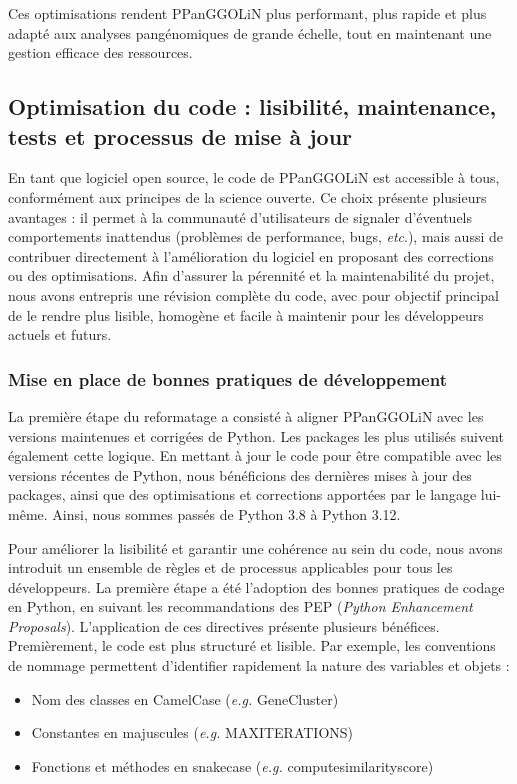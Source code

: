 Ces optimisations rendent PPanGGOLiN plus performant, plus rapide et plus adapté aux analyses pangénomiques de grande échelle, tout en maintenant une gestion efficace des ressources.

\subsection{Optimisation du code : lisibilité, maintenance, tests et processus de mise à jour}

En tant que logiciel open source, le code de PPanGGOLiN est accessible à tous, conformément aux principes de la science ouverte. Ce choix présente plusieurs avantages : il permet à la communauté d’utilisateurs de signaler d’éventuels comportements inattendus (problèmes de performance, bugs, \textit{etc}.), mais aussi de contribuer directement à l’amélioration du logiciel en proposant des corrections ou des optimisations.
Afin d’assurer la pérennité et la maintenabilité du projet, nous avons entrepris une révision complète du code, avec pour objectif principal de le rendre plus lisible, homogène et facile à maintenir pour les développeurs actuels et futurs.

\subsubsection{Mise en place de bonnes pratiques de développement}

La première étape du reformatage a consisté à aligner PPanGGOLiN avec les versions maintenues et corrigées de Python. Les packages les plus utilisés suivent également cette logique. En mettant à jour le code pour être compatible avec les versions récentes de Python, nous bénéficions des dernières mises à jour des packages, ainsi que des optimisations et corrections apportées par le langage lui-même. Ainsi, nous sommes passés de Python 3.8 à Python 3.12.

Pour améliorer la lisibilité et garantir une cohérence au sein du code, nous avons introduit un ensemble de règles et de processus applicables pour tous les développeurs. La première étape a été l’adoption des bonnes pratiques de codage en Python, en suivant les recommandations des PEP (\textit{Python Enhancement Proposals}).
L’application de ces directives présente plusieurs bénéfices. Premièrement, le code est plus structuré et lisible. Par exemple, les conventions de nommage permettent d’identifier rapidement la nature des variables et objets :

\begin{itemize}
    \item Nom des classes en CamelCase (\textit{e.g.} GeneCluster)
    \item Constantes en majuscules (\textit{e.g.} MAX\textunderscore ITERATIONS)
    \item Fonctions et méthodes en snake\textunderscore case (\textit{e.g.} compute\textunderscore similarity\textunderscore score)
\end{itemize}

